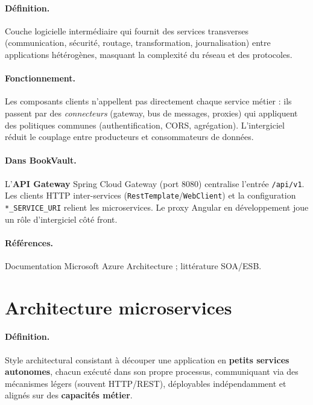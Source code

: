 \documentclass[12pt,a4paper]{report}
\begin{document}
\paragraph{Définition.} Couche logicielle intermédiaire qui fournit des services transverses (communication, sécurité, routage, transformation, journalisation) entre applications hétérogènes, masquant la complexité du réseau et des protocoles.\par

\paragraph{Fonctionnement.} Les composants clients n'appellent pas directement chaque service métier : ils passent par des \textit{connecteurs} (gateway, bus de messages, proxies) qui appliquent des politiques communes (authentification, CORS, agrégation). L'intergiciel réduit le couplage entre producteurs et consommateurs de données.\par

\paragraph{Dans BookVault.} L'\textbf{API Gateway} Spring Cloud Gateway (port 8080) centralise l'entrée \texttt{/api/v1}. Les clients HTTP inter-services (\texttt{RestTemplate}/\texttt{WebClient}) et la configuration \texttt{*\_SERVICE\_URI} relient les microservices. Le proxy Angular en développement joue un rôle d'intergiciel côté front.\par

\paragraph{Références.} Documentation Microsoft Azure Architecture ; littérature SOA/ESB.\par


\section{Architecture microservices}

\paragraph{Définition.} Style architectural consistant à découper une application en \textbf{petits services autonomes}, chacun exécuté dans son propre processus, communiquant via des mécanismes légers (souvent HTTP/REST), déployables indépendamment et alignés sur des \textbf{capacités métier}.\par
\end{document}
